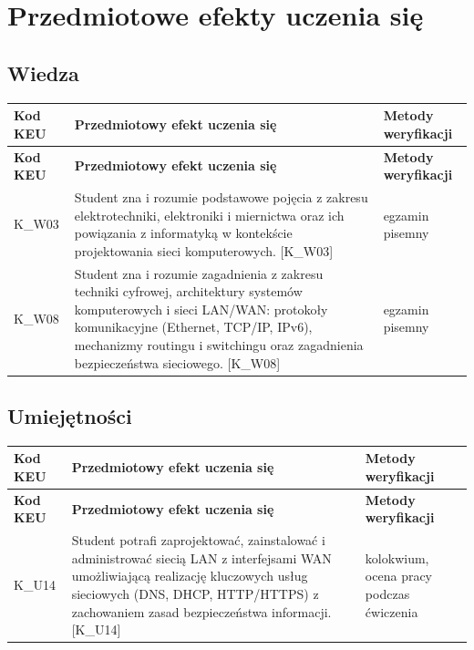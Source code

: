 \documentclass[12pt, a4paper]{article}
\newcommand{\thdrule}{\noalign{\global\setlength{\extrarowheight}{0pt}}}
\newcommand{\thdend}{\noalign{\global\setlength{\extrarowheight}{3pt}}}
\begin{document}
\section{Przedmiotowe efekty uczenia się}

\subsection*{Wiedza}
{\scriptsize
\begin{longtable}{m{1.6cm}m{9.0cm}m{4.2cm}}
\thdrule\toprule
\rowcolor{pjatkRed} {\color{white}\footnotesize\textbf{\vphantom{Ag}Kod KEU}} & {\color{white}\footnotesize\textbf{\vphantom{Ag}Przedmiotowy efekt uczenia się}} & {\color{white}\footnotesize\textbf{\vphantom{Ag}Metody weryfikacji}} \\
\midrule\thdend
\endfirsthead
\thdrule\toprule
\rowcolor{pjatkRed} {\color{white}\footnotesize\textbf{\vphantom{Ag}Kod KEU}} & {\color{white}\footnotesize\textbf{\vphantom{Ag}Przedmiotowy efekt uczenia się}} & {\color{white}\footnotesize\textbf{\vphantom{Ag}Metody weryfikacji}} \\
\midrule\thdend
\endhead
  \rowcolor{tableRowLight} K\_W03 & Student zna i rozumie podstawowe pojęcia z zakresu elektrotechniki, elektroniki i miernictwa oraz ich powiązania z informatyką w kontekście projektowania sieci komputerowych. {[}K\_W03{]} & egzamin pisemny \\
  \rowcolor{tableRowAlt} K\_W08 & Student zna i rozumie zagadnienia z zakresu techniki cyfrowej, architektury systemów komputerowych i sieci LAN/WAN: protokoły komunikacyjne (Ethernet, TCP/IP, IPv6), mechanizmy routingu i switchingu oraz zagadnienia bezpieczeństwa sieciowego. {[}K\_W08{]} & egzamin pisemny \\
\bottomrule
\end{longtable}}

\subsection*{Umiejętności}
{\scriptsize
\begin{longtable}{m{1.6cm}m{9.0cm}m{4.2cm}}
\thdrule\toprule
\rowcolor{pjatkRed} {\color{white}\footnotesize\textbf{\vphantom{Ag}Kod KEU}} & {\color{white}\footnotesize\textbf{\vphantom{Ag}Przedmiotowy efekt uczenia się}} & {\color{white}\footnotesize\textbf{\vphantom{Ag}Metody weryfikacji}} \\
\midrule\thdend
\endfirsthead
\thdrule\toprule
\rowcolor{pjatkRed} {\color{white}\footnotesize\textbf{\vphantom{Ag}Kod KEU}} & {\color{white}\footnotesize\textbf{\vphantom{Ag}Przedmiotowy efekt uczenia się}} & {\color{white}\footnotesize\textbf{\vphantom{Ag}Metody weryfikacji}} \\
\midrule\thdend
\endhead
  \rowcolor{tableRowLight} K\_U14 & Student potrafi zaprojektować, zainstalować i administrować siecią LAN z interfejsami WAN umożliwiającą realizację kluczowych usług sieciowych (DNS, DHCP, HTTP/HTTPS) z zachowaniem zasad bezpieczeństwa informacji. {[}K\_U14{]} & kolokwium, ocena pracy podczas ćwiczenia \\
\bottomrule
\end{longtable}}
\end{document}
